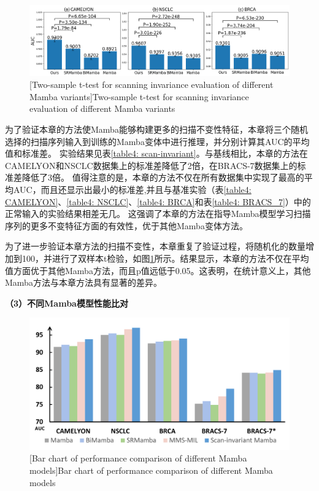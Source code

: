 \begin{figure}[h!]
  \centering
  \includegraphics[width=1.0\columnwidth]{figures/scan_invariant.png}
  [Two-sample t-test for scanning invariance evaluation of different Mamba variants]{Two-sample t-test for scanning invariance evaluation of different Mamba variants}
  \label{figure4: scan-invariant}
\end{figure}

为了验证本章的方法使Mamba能够构建更多的扫描不变性特征，本章将三个随机选择的扫描序列输入到训练的Mamba变体中进行推理，并分别计算其AUC的平均值和标准差。
实验结果见表\ref{table4: scan-invariant}。与基线相比，本章的方法在CAMELYON和NSCLC数据集上的标准差降低了2倍，在BRACS-7数据集上的标准差降低了3倍。
值得注意的是，本章的方法不仅在所有数据集中实现了最高的平均AUC，而且还显示出最小的标准差,并且与基准实验（表\ref{table4: CAMELYON}、\ref{table4: NSCLC}、\ref{table4: BRCA}和表\ref{table4: BRACS_7}）中的正常输入的实验结果相差无几。
这强调了本章的方法在指导Mamba模型学习扫描序列的更多不变特征方面的有效性，优于其他Mamba变体方法。

为了进一步验证本章方法的扫描不变性，本章重复了验证过程，将随机化的数量增加到100，并进行了双样本t检验，如图\ref{figure4: scan-invariant}所示。结果显示，本章的方法不仅在平均值方面优于其他Mamba方法，而且p值远低于0.05。这表明，在统计意义上，其他Mamba方法与本章方法具有显著的差异。

\textbf{（3）不同Mamba模型性能比对}

\begin{figure}[h!]
  \centering
  \includegraphics[width=0.9\columnwidth]{figures/SMCMIL的不同Mamba比较.pdf}
  [Bar chart of performance comparison of different Mamba models]{Bar chart of performance comparison of different Mamba models}
  \label{figure4: DifferentMamba}
\end{figure}

